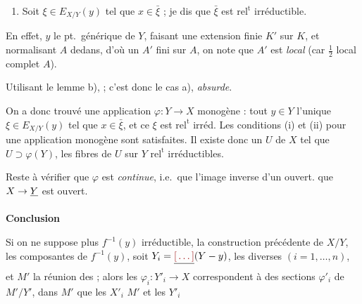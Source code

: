 \documentclass[11pt,a4paper]{article}
\begin{document}
\begin{enumerate}
\item[(ii)] Soit $\xi \in E_{X/Y}(y)$ tel que $x \in \bar{\xi}$
 ; je dis que $\bar{\xi}$ est
$\mathrm{rel}^{\mathrm{t}}$ irréductible.
\end{enumerate}

En effet, \struck{\ill{}} \ill{} $y$ le pt.\ générique de $Y$, faisant une
extension finie $K'$ sur $K$, et normalisant $A$ dedans, d'où un $A'$ fini sur
$A$, on note que $A'$ est \emph{local}  (car $\frac{1}{2}$ local complet $A$).


Utilisant le lemme
b),  \ill{} ; c'est
donc le cas a), \emph{absurde}.

On a donc trouvé une application $\varphi : Y \to X$ monogène : \ill{} tout
$y \in Y$ l'unique  $\xi \in E_{X/Y}(y)$ tel que
$x \in \bar{\xi}$, et ce $\xi$ est $\mathrm{rel}^{\mathrm{t}}$ irréd. Les
conditions (i) et (ii) pour une application monogène sont satisfaites. Il
existe donc un \ill{} $U$ de $X$ tel que $U \supset \varphi(Y)$, les fibres de
$U$ sur $Y$ \ill{} $\mathrm{rel}^{\mathrm{t}}$ irréductibles.


Reste à vérifier que $\varphi$ est \emph{continue}, i.e.\ que \ill{} l'image
inverse \ill{} d'un ouvert.  \ill{} que $X \to \struck{Y}$ est \struck{\ill{}} ouvert.


\textbf{Conclusion} \ill{}


Si on ne suppose plus $f^{-1}(y)$ irréductible, \ill{} \ill{} la construction
précédente \ill{}  \ill{} de $X/Y$, \ill{} les composantes de
$f^{-1}(y)$, soit $Y_i = \struck{\ill{}}(Y - y)$, les diverses
$(i = 1, \ldots, n)$, et $M'$ la réunion des \ill{} ; alors les $\varphi_i :
Y'_i \to X$ \ill{} correspondent à des sections $\varphi'_i$ de $M'/Y'$, dans
\ill{} $M'$ \ill{} que les $X'_i$ \ill{} $M'$ et les $Y'_i$ \ill{}
\end{document}

